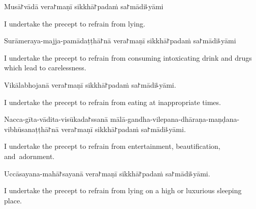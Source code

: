 \clearpage

\begin{precept}
  \setcounter{enumi}{3}
  \item Musā꜓vādā vera꜓maṇī sikkhā꜓padaṁ sa꜓mādi꜕yāmi
\end{precept}

\begin{english}
  I undertake the precept to refrain from lying.
\end{english}

\begin{precept}
  \setcounter{enumi}{4}
  \item Surāmeraya-majja-pamādaṭṭhā꜓nā vera꜓maṇī sikkhā꜓padaṁ sa꜓mādi꜕yāmi
\end{precept}

\begin{english}
  I undertake the precept to refrain from consuming intoxicating drink and drugs which lead to carelessness.
\end{english}

\begin{precept}
  \setcounter{enumi}{5}
  \item Vikālabhojanā vera꜓maṇī sikkhā꜓padaṁ sa꜓mādi꜕yāmi.
\end{precept}

\begin{english}
  I undertake the precept to refrain from eating at inappropriate times.
\end{english}

\begin{precept}
  \setcounter{enumi}{6}
  \item Nacca-gīta-vādita-visūkada꜓ssanā mālā-gandha-vilepana-dhāraṇa-maṇḍana-vibhūsanaṭṭhā꜓nā vera꜓maṇī sikkhā꜓padaṁ sa꜓mādi꜕yāmi.
\end{precept}

\begin{english}
  I undertake the precept to refrain from entertainment, beautification, and~adornment.
\end{english}

\begin{precept}
  \setcounter{enumi}{7}
  \item Uccāsayana-mahā꜓sayanā vera꜓maṇī sikkhā꜓padaṁ sa꜓mādi꜕yāmi.
\end{precept}

\begin{english}
  I undertake the precept to refrain from lying on a high or luxurious sleeping place.
\end{english}

